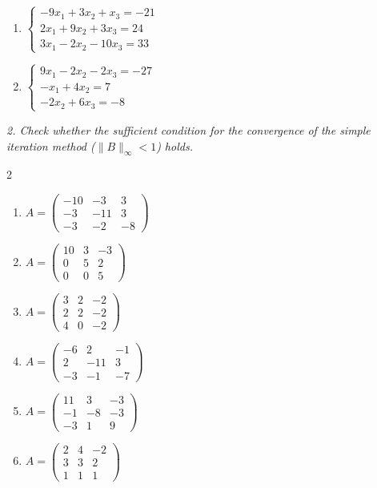 \begin{enumerate}[label=\arabic*., leftmargin=*]
\item $\begin{cases}-9x_1+3x_2+x_3=-21\\2x_1+9x_2+3x_3=24\\3x_1-2x_2-10x_3=33\end{cases}$
\item $\begin{cases}9x_1-2x_2-2x_3=-27\\-x_1+4x_2=7\\-2x_2+6x_3=-8\end{cases}$
\end{enumerate}

\emph{2. Check whether the sufficient condition for the convergence of the simple iteration method ($\|B\|_\infty<1$) holds.}
\bigskip
\begin{multicols}{2}\raggedright
\begin{enumerate}[label=\arabic*., leftmargin=*]
\item $A=\begin{pmatrix}-10 & -3 & 3\\ -3 & -11 & 3\\ -3 & -2 & -8\end{pmatrix}$
\item $A=\begin{pmatrix}10 & 3 & -3\\ 0 & 5 & 2\\ 0 & 0 & 5\end{pmatrix}$
\item $A=\begin{pmatrix}3 & 2 & -2\\ 2 & 2 & -2\\ 4 & 0 & -2\end{pmatrix}$
\item $A=\begin{pmatrix}-6 & 2 & -1\\ 2 & -11 & 3\\ -3 & -1 & -7\end{pmatrix}$
\item $A=\begin{pmatrix}11 & 3 & -3\\ -1 & -8 & -3\\ -3 & 1 & 9\end{pmatrix}$
\item $A=\begin{pmatrix}2 & 4 & -2\\ 3 & 3 & 2\\ 1 & 1 & 1\end{pmatrix}$

\end{enumerate}
\end{multicols}
